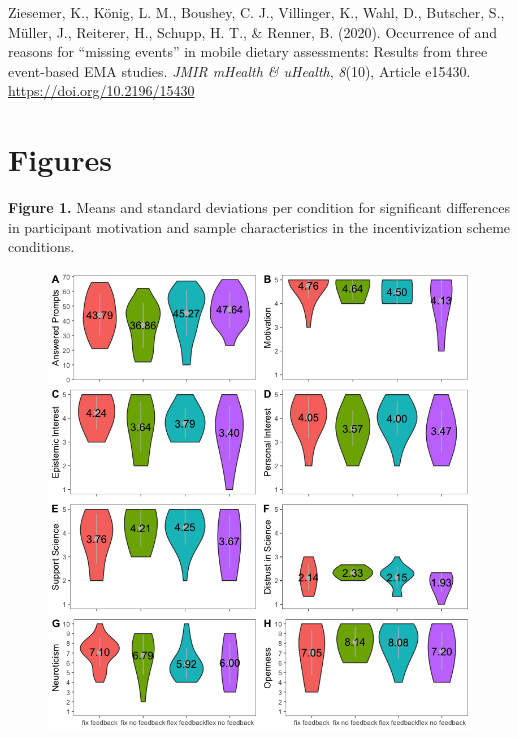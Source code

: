 \documentclass[authordate, empirical]{jote-new-article}
\begin{document}
	Ziesemer, K., König, L. M., Boushey, C. J., Villinger, K., Wahl, D., Butscher, S., Müller, J., Reiterer, H., Schupp, H. T., \& Renner, B. (2020). Occurrence of and reasons for “missing events” in mobile dietary assessments: Results from three event-based EMA studies. \emph{JMIR mHealth \& uHealth},\emph{ 8}(10), Article e15430. \href{https://doi.org/10.2196/15430}{https://doi.org/10.2196/15430}







	\section{\textbf{Figures}}



	\textbf{Figure 1.} Means and standard deviations per condition for significant differences in participant motivation and sample characteristics in the incentivization scheme conditions.
	\begin{figure}
		\includegraphics[width=\linewidth]{media/image1.png}

		\caption{}

		\label{fig:rId35}


	\end{figure}
\end{document}
